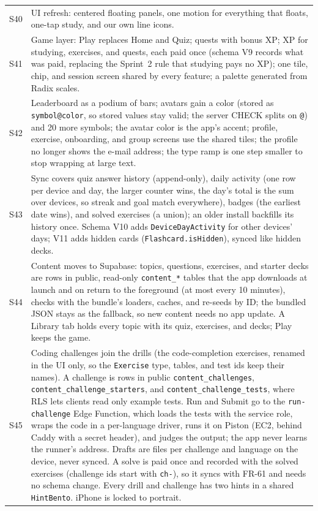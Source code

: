 \documentclass[12pt,letterpaper]{article}
\begin{document}
\begin{xltabular}{\textwidth}{@{}l Y@{}}
S40 & UI refresh: centered floating panels, one motion for everything that floats, one-tap study, and our own line icons. \\
S41 & Game layer: Play replaces Home and Quiz; quests with bonus XP; XP for studying, exercises, and quests, each paid once (schema V9 records what was paid, replacing the Sprint~2 rule that studying pays no XP); one tile, chip, and session screen shared by every feature; a palette generated from Radix scales. \\
S42 & Leaderboard as a podium of bars; avatars gain a color (stored as \texttt{symbol@color}, so stored values stay valid; the server CHECK splits on \texttt{@}) and 20 more symbols; the avatar color is the app's accent; profile, exercise, onboarding, and group screens use the shared tiles; the profile no longer shows the e-mail address; the type ramp is one step smaller to stop wrapping at large text. \\
S43 & Sync covers quiz answer history (append-only), daily activity (one row per device and day, the larger counter wins, the day's total is the sum over devices, so streak and goal match everywhere), badges (the earliest date wins), and solved exercises (a union); an older install backfills its history once. Schema V10 adds \texttt{DeviceDayActivity} for other devices' days; V11 adds hidden cards (\texttt{Flashcard.isHidden}), synced like hidden decks. \\
S44 & Content moves to Supabase: topics, questions, exercises, and starter decks are rows in public, read-only \texttt{content\_*} tables that the app downloads at launch and on return to the foreground (at most every 10 minutes), checks with the bundle's loaders, caches, and re-seeds by ID; the bundled JSON stays as the fallback, so new content needs no app update. A Library tab holds every topic with its quiz, exercises, and decks; Play keeps the game. \\
S45 & Coding challenges join the drills (the code-completion exercises, renamed in the UI only, so the \texttt{Exercise} type, tables, and test ids keep their names). A challenge is rows in public \texttt{content\_challenges}, \texttt{content\_challenge\_starters}, and \texttt{content\_challenge\_tests}, where RLS lets clients read only example tests. Run and Submit go to the \texttt{run-challenge} Edge Function, which loads the tests with the service role, wraps the code in a per-language driver, runs it on Piston (EC2, behind Caddy with a secret header), and judges the output; the app never learns the runner's address. Drafts are files per challenge and language on the device, never synced. A solve is paid once and recorded with the solved exercises (challenge ids start with \texttt{ch-}), so it syncs with FR-61 and needs no schema change. Every drill and challenge has two hints in a shared \texttt{HintBento}. iPhone is locked to portrait. \\

\end{xltabular}
\end{document}
